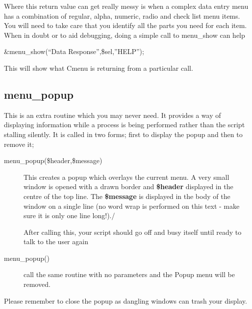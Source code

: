 \documentclass[a4paper]{scrartcl}
\begin{document}
Where this return value can get really messy is when a complex data entry menu has a combination of regular, alpha, numeric, radio and check list menu items. You will need to take care that you identify all the parts you need for each item. When in doubt or to aid debugging, doing a simple call to menu\_show can help
\begin{center}
\&menu\_show(``Data Response'',\$sel,''HELP'');
\end{center}
This will show what Cmenu is returning from a particular call.

\subsection{menu\_popup}
This is an extra routine which you may never need. It provides a way of displaying information while a process is being performed rather than the script stalling silently. It is called in two forms; first to display the popup and then to remove it;
\begin{description}
\item [menu\_popup(\$header,\$message)] This creates a popup which overlays the current menu. A very small window is opened with a drawn border and \textbf{\$header} displayed in the centre of the top line. The \textbf{\$message} is displayed in the body of the window on a single line (no word wrap is performed on this text - make sure it is only one line long!)./

After calling this, your script should go off and busy itself until ready to talk to the user again
\item [menu\_popup()] call the same routine with no parameters and the Popup menu will be removed.
\end{description}
Please remember to close the popup as dangling windows can trash your display.
\end{document}
